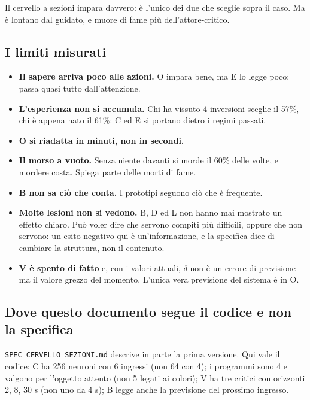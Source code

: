 \documentclass[11pt,a4paper]{article}
\begin{document}
Il cervello a sezioni impara davvero: è l'unico dei due che sceglie sopra il caso. Ma è
lontano dal guidato, e muore di fame più dell'attore-critico.

\subsection{I limiti misurati}

\begin{itemize}
\item \textbf{Il sapere arriva poco alle azioni.} O impara bene, ma E lo legge poco: passa
  quasi tutto dall'attenzione.
\item \textbf{L'esperienza non si accumula.} Chi ha vissuto 4 inversioni sceglie il 57\%,
  chi è appena nato il 61\%: C ed E si portano dietro i regimi passati.
\item \textbf{O si riadatta in minuti, non in secondi.}
\item \textbf{Il morso a vuoto.} Senza niente davanti si morde il 60\% delle volte, e
  mordere costa. Spiega parte delle morti di fame.
\item \textbf{B non sa ciò che conta.} I prototipi seguono ciò che è frequente.
\item \textbf{Molte lesioni non si vedono.} B, D ed L non hanno mai mostrato un effetto
  chiaro. Può voler dire che servono compiti più difficili, oppure che non servono: un
  esito negativo qui è un'informazione, e la specifica dice di cambiare la struttura, non
  il contenuto.
\item \textbf{V è spento di fatto} e, con i valori attuali, $\delta$ non è un errore di
  previsione ma il valore grezzo del momento. L'unica vera previsione del sistema è in O.
\end{itemize}

\subsection{Dove questo documento segue il codice e non la specifica}

\texttt{SPEC\_CERVELLO\_SEZIONI.md} descrive in parte la prima versione. Qui vale il codice:
C ha 256 neuroni con 6 ingressi (non 64 con 4); i programmi sono 4 e valgono per l'oggetto
attento (non 5 legati ai colori); V ha tre critici con orizzonti 2, 8, 30 s (non uno
da 4 s); B legge anche la previsione del prossimo ingresso.

\end{document}
